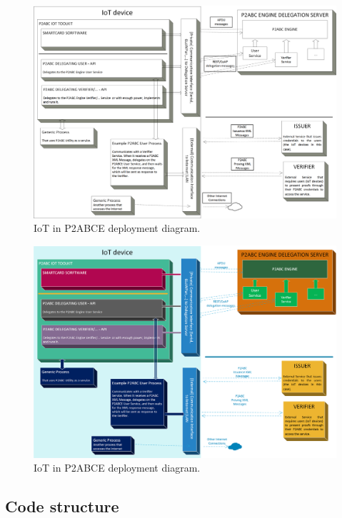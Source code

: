 \begin{figure}[bth]
	\begin{center}
		\includegraphics[width=\linewidth]{gfx/P2ABCE-IoT-bw}
	\end{center}
	\caption{IoT in P2ABCE deployment diagram.}
	\label{fig:P2ABCE-IoT}
\end{figure}

\begin{figure}[bth]
	\begin{center}
		\includegraphics[width=\linewidth]{gfx/P2ABCE-IoT-color}
	\end{center}
	\caption{IoT in P2ABCE deployment diagram.}
	\label{fig:P2ABCE-IoT-color}
\end{figure}



\subsection{Code structure}


